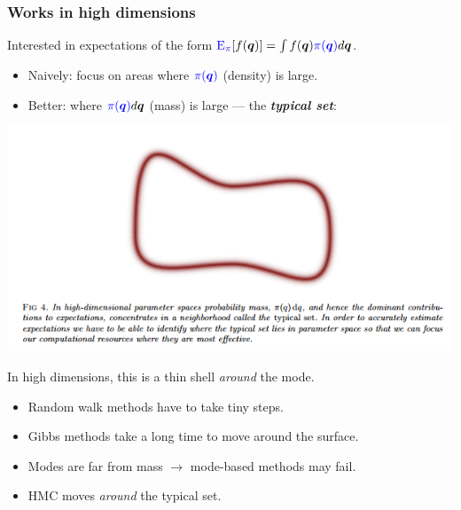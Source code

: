 \documentclass[xcolor=dvipsnames]{beamer}
\begin{document}
\begin{frame}
\frametitle{Works in high dimensions}
Interested in expectations of the form ${\color{blue}\mathrm{E}}_{\color{blue}\pi}[f(\bm{q})] = \int f(\bm{q}){\color{blue}\pi(\bm{q})}d\bm{q}$.
\begin{itemize}
\item Naively: focus on areas where ${\color{blue}\pi(\bm{q})}$ (density) is large.
\item Better: where ${\color{blue}\pi(\bm{q})}d\bm{q}$ (mass) is large --- the \emph{\textbf{\color{red} typical set}}:
\end{itemize}
\begin{center}
\includegraphics[height=0.4\textheight]{typicalset.png}
\end{center}
In high dimensions, this is a thin shell \emph{around} the mode.
\begin{itemize}
\item Random walk methods have to take tiny steps.
\item Gibbs methods take a long time to move around the surface.
\item Modes are far from mass $\to$ mode-based methods may fail.
\item HMC moves \emph{around} the typical set.
\end{itemize}
\end{frame}
\end{document}

